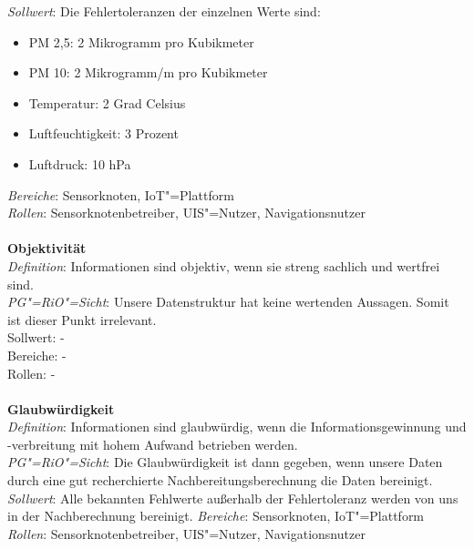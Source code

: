 \textit{Sollwert}: Die Fehlertoleranzen der einzelnen Werte sind:
\begin{itemize}
\item	PM 2,5: 2 Mikrogramm pro Kubikmeter
\item	PM 10: 2 Mikrogramm/m pro Kubikmeter
\item	Temperatur: 2 Grad Celsius
\item	Luftfeuchtigkeit: 3 Prozent
\item	Luftdruck: 10 hPa
\end{itemize}
\textit{Bereiche}: Sensorknoten, IoT"=Plattform \\
\textit{Rollen}: Sensorknotenbetreiber, UIS"=Nutzer, Navigationsnutzer \\ \\
\textbf{Objektivität} \\
\textit{Definition}: Informationen sind objektiv, wenn sie streng sachlich und wertfrei sind. \\
\textit{PG"=RiO"=Sicht}: Unsere Datenstruktur hat keine wertenden Aussagen. Somit ist dieser Punkt irrelevant. \\
Sollwert: - \\
Bereiche: - \\
Rollen: - \\
\\
\textbf{Glaubwürdigkeit}\\
\textit{Definition}: Informationen sind glaubwürdig, wenn die Informationsgewinnung und -verbreitung mit hohem Aufwand betrieben werden.\\
\textit{PG"=RiO"=Sicht}: Die Glaubwürdigkeit ist dann gegeben, wenn unsere Daten durch eine gut recherchierte Nachbereitungsberechnung die Daten bereinigt.  
\textit{Sollwert}: Alle bekannten Fehlwerte außerhalb der Fehlertoleranz werden von uns in der Nachberechnung bereinigt.
\textit{Bereiche}: Sensorknoten, IoT"=Plattform
\textit{Rollen}: Sensorknotenbetreiber, UIS"=Nutzer, Navigationsnutzer

